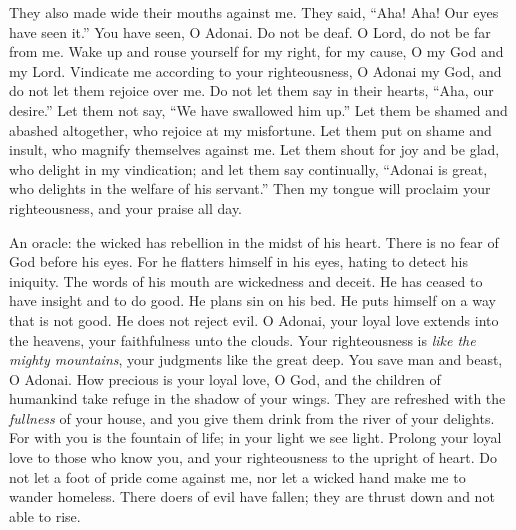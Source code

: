 \begin{biblechapter}
\verse They also made wide their mouths against me. 
They said, “Aha! Aha! 
Our eyes have seen it.”
\verse You have seen, O Adonai. Do not be deaf. 
O Lord, do not be far from me.
\verse Wake up and rouse yourself for my right, 
for my cause, O my God and my Lord.
\verse Vindicate me according to your righteousness, 
O Adonai my God, 
and do not let them rejoice over me.
\verse Do not let them say in their hearts, “Aha, our desire.” 
Let them not say, “We have swallowed him up.”
\verse Let them be shamed and abashed altogether, 
who rejoice at my misfortune. 
Let them put on shame and insult, 
who magnify themselves against me.
\verse Let them shout for joy and be glad, 
who delight in my vindication; 
and let them say continually, “Adonai is great, 
who delights in the welfare of his servant.”
\verse Then my tongue will proclaim your righteousness, 
and your praise all day.
\end{biblechapter}

\begin{biblechapter} %
 An oracle: the wicked has rebellion 
in the midst of his heart. 
There is no fear of God before his eyes.
\verse For he flatters himself in his eyes, 
hating to detect his iniquity.
\verse The words of his mouth are wickedness and deceit. 
He has ceased to have insight and to do good.
\verse He plans sin on his bed. 
He puts himself on a way that is not good. 
He does not reject evil.
\verse O Adonai, your loyal love extends into the heavens, 
your faithfulness unto the clouds.
\verse Your righteousness is \textit{like the mighty mountains}, 
your judgments like the great deep. 
You save man and beast, O Adonai.
\verse How precious is your loyal love, O God, 
and the children of humankind 
take refuge in the shadow of your wings.
\verse They are refreshed with the \textit{fullness} of your house, 
and you give them drink from the river of your delights.
\verse For with you is the fountain of life; 
in your light we see light.
\verse Prolong your loyal love to those who know you, 
and your righteousness to the upright of heart.
\verse Do not let a foot of pride come against me, 
nor let a wicked hand make me to wander homeless.
\verse There doers of evil have fallen; 
they are thrust down and not able to rise.
\end{biblechapter}

